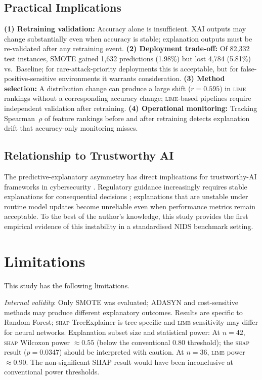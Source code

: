 \documentclass[conference,a4paper]{IEEEtran}
\newcommand{\SHAP}{\textsc{shap}\xspace}
\newcommand{\LIME}{\textsc{lime}\xspace}
\newcommand{\NIDS}{NIDS\xspace}
\newcommand{\SMOTE}{SMOTE\xspace}
\newcommand{\XAI}{XAI\xspace}
\begin{document}
\subsection{Practical Implications}

\noindent\textbf{(1) Retraining validation:} Accuracy alone is insufficient.
\XAI outputs may change substantially even when accuracy is stable; explanation
outputs must be re-validated after any retraining event. \textbf{(2) Deployment
trade-off:} Of 82,332 test instances, \SMOTE gained 1,632 predictions (1.98\%)
but lost 4,784 (5.81\%) vs.\ Baseline; for rare-attack-priority deployments this
is acceptable, but for false-positive-sensitive environments it warrants
consideration. \textbf{(3) Method
selection:} A distribution change can produce a large shift ($r=0.595$) in \LIME
rankings without a corresponding accuracy change; \LIME-based pipelines require
independent validation after retraining. \textbf{(4) Operational monitoring:}
Tracking Spearman~$\rho$ of feature rankings before and after retraining detects
explanation drift that accuracy-only monitoring misses.

\vspace{-0.5em}
\subsection{Relationship to Trustworthy AI}

The predictive-explanatory asymmetry has direct implications for trustworthy-AI
frameworks in cybersecurity \cite{charmet2022,rjoub2023}. Regulatory guidance
increasingly requires stable explanations for consequential decisions
\cite{euaiact2024}; explanations that are unstable under routine model updates
become unreliable even when performance metrics remain acceptable. To the best of
the author's knowledge, this study provides the first empirical evidence of this
instability in a standardised \NIDS benchmark setting.

\section{Limitations}
\label{sec:limitations}

This study has the following limitations.

\textit{Internal validity}: Only \SMOTE was evaluated; ADASYN and cost-sensitive
methods may produce different explanatory outcomes. Results are specific to Random
Forest; \SHAP TreeExplainer is tree-specific and \LIME sensitivity may differ for
neural networks. Explanation subset size and statistical power: At $n=42$, \SHAP
Wilcoxon power $\approx0.55$ (below the conventional 0.80 threshold); the \SHAP
result ($p=0.0347$) should be interpreted with caution. At $n=36$, \LIME power
$\approx0.90$. The non-significant SHAP result would have been inconclusive at
conventional power thresholds.
\end{document}

